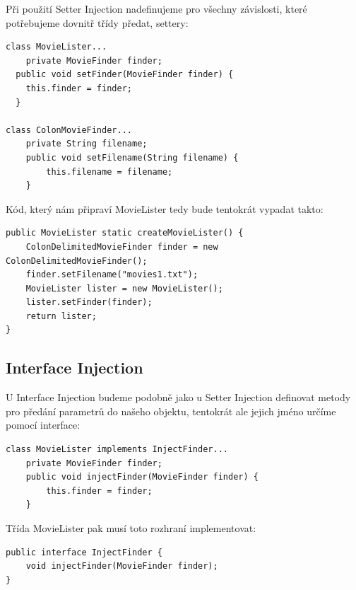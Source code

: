 \documentclass[a4paper,conference]{IEEEtran}
\begin{document}
Při použití Setter Injection nadefinujeme pro všechny závislosti, které potřebujeme dovnitř třídy předat, settery:

\lstset{language=Java, caption=MovieLister a Setter Injection, label=listing:Java}
\begin{lstlisting}
class MovieLister...
    private MovieFinder finder;
  public void setFinder(MovieFinder finder) {
    this.finder = finder;
  }

class ColonMovieFinder...
    private String filename;
    public void setFilename(String filename) {
        this.filename = filename;
    }
\end{lstlisting}

Kód, který nám připraví MovieLister tedy bude tentokrát vypadat takto:

\lstset{language=Java, caption=MovieLister Setter Injection a factory metoda, label=listing:Java}
\begin{lstlisting}
public MovieLister static createMovieLister() {
    ColonDelimitedMovieFinder finder = new ColonDelimitedMovieFinder();
    finder.setFilename("movies1.txt");
    MovieLister lister = new MovieLister();
    lister.setFinder(finder);
    return lister;
}
\end{lstlisting}

\subsection{Interface Injection}

U Interface Injection budeme podobně jako u Setter Injection definovat metody pro předání parametrů do našeho objektu, tentokrát ale jejich jméno určíme pomocí interface:

\lstset{language=Java,caption=Třída MovieLister implementující definované rozhraní,label=listing:Java}
\begin{lstlisting}
class MovieLister implements InjectFinder...
    private MovieFinder finder;
    public void injectFinder(MovieFinder finder) {
        this.finder = finder;
    }
\end{lstlisting}

Třída MovieLister pak musí toto rozhraní implementovat:

\lstset{language=Java,caption=Interface pro interface injection,label=listing:Java}
\begin{lstlisting}
public interface InjectFinder {
    void injectFinder(MovieFinder finder);
}
\end{lstlisting}
\end{document}
